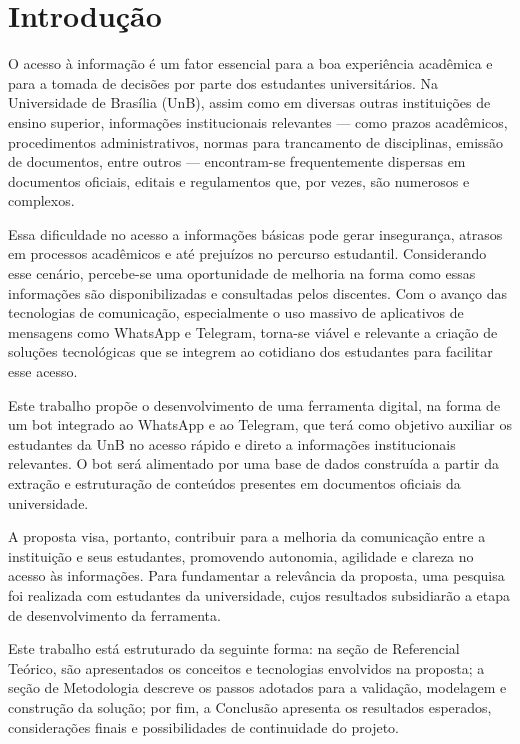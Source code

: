 \chapter[Introdução]{Introdução}

O acesso à informação é um fator essencial para a boa experiência acadêmica e para a tomada de decisões por parte dos estudantes universitários. Na Universidade de Brasília (UnB), assim como em diversas outras instituições de ensino superior, informações institucionais relevantes — como prazos acadêmicos, procedimentos administrativos, normas para trancamento de disciplinas, emissão de documentos, entre outros — encontram-se frequentemente dispersas em documentos oficiais, editais e regulamentos que, por vezes, são numerosos e complexos.


Essa dificuldade no acesso a informações básicas pode gerar insegurança, atrasos em processos acadêmicos e até prejuízos no percurso estudantil. Considerando esse cenário, percebe-se uma oportunidade de melhoria na forma como essas informações são disponibilizadas e consultadas pelos discentes. Com o avanço das tecnologias de comunicação, especialmente o uso massivo de aplicativos de mensagens como WhatsApp e Telegram, torna-se viável e relevante a criação de soluções tecnológicas que se integrem ao cotidiano dos estudantes para facilitar esse acesso.


Este trabalho propõe o desenvolvimento de uma ferramenta digital, na forma de um bot integrado ao WhatsApp e ao Telegram, que terá como objetivo auxiliar os estudantes da UnB no acesso rápido e direto a informações institucionais relevantes. O bot será alimentado por uma base de dados construída a partir da extração e estruturação de conteúdos presentes em documentos oficiais da universidade.

A proposta visa, portanto, contribuir para a melhoria da comunicação entre a instituição e seus estudantes, promovendo autonomia, agilidade e clareza no acesso às informações. Para fundamentar a relevância da proposta, uma pesquisa foi realizada com estudantes da universidade, cujos resultados subsidiarão a etapa de desenvolvimento da ferramenta.

Este trabalho está estruturado da seguinte forma: na seção de Referencial Teórico, são apresentados os conceitos e tecnologias envolvidos na proposta; a seção de Metodologia descreve os passos adotados para a validação, modelagem e construção da solução; por fim, a Conclusão apresenta os resultados esperados, considerações finais e possibilidades de continuidade do projeto.

